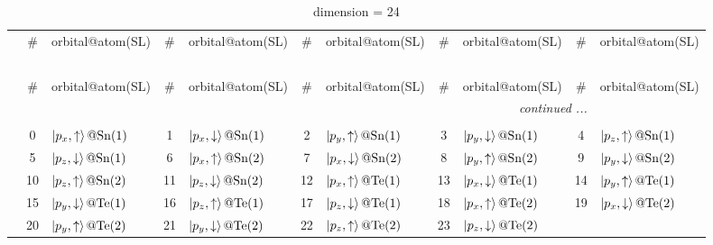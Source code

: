 \documentclass[fleqn,10pt,landscape]{jsarticle}
\begin{document}
\renewcommand{\arraystretch}{1.6}
\begin{longtable}[l]{c|cl|cl|cl|cl|cl}
\captionsetup{justification=raggedright, singlelinecheck=off}
\caption{dimension = 24}
 \\
 \hline \hline
 & \# & orbital@atom(SL) & \# & orbital@atom(SL) & \# & orbital@atom(SL) & \# & orbital@atom(SL) & \# & orbital@atom(SL) \\ \hline \endfirsthead

\multicolumn{10}{l}{\tablename\ \thetable{}} \\
 \hline \hline
 & \# & orbital@atom(SL) & \# & orbital@atom(SL) & \# & orbital@atom(SL) & \# & orbital@atom(SL) & \# & orbital@atom(SL) \\ \hline \endhead

 \hline \hline
\multicolumn{10}{r}{\footnotesize\it continued ...} \\ \endfoot

 \hline \hline
\multicolumn{10}{r}{} \\ \endlastfoot

 & 0 & $\ket{p_{x},\uparrow}@{\rm Sn}(1)$ & 1 & $\ket{p_{x},\downarrow}@{\rm Sn}(1)$ & 2 & $\ket{p_{y},\uparrow}@{\rm Sn}(1)$ & 3 & $\ket{p_{y},\downarrow}@{\rm Sn}(1)$ & 4 & $\ket{p_{z},\uparrow}@{\rm Sn}(1)$ \\
& 5 & $\ket{p_{z},\downarrow}@{\rm Sn}(1)$ & 6 & $\ket{p_{x},\uparrow}@{\rm Sn}(2)$ & 7 & $\ket{p_{x},\downarrow}@{\rm Sn}(2)$ & 8 & $\ket{p_{y},\uparrow}@{\rm Sn}(2)$ & 9 & $\ket{p_{y},\downarrow}@{\rm Sn}(2)$ \\
& 10 & $\ket{p_{z},\uparrow}@{\rm Sn}(2)$ & 11 & $\ket{p_{z},\downarrow}@{\rm Sn}(2)$ & 12 & $\ket{p_{x},\uparrow}@{\rm Te}(1)$ & 13 & $\ket{p_{x},\downarrow}@{\rm Te}(1)$ & 14 & $\ket{p_{y},\uparrow}@{\rm Te}(1)$ \\
& 15 & $\ket{p_{y},\downarrow}@{\rm Te}(1)$ & 16 & $\ket{p_{z},\uparrow}@{\rm Te}(1)$ & 17 & $\ket{p_{z},\downarrow}@{\rm Te}(1)$ & 18 & $\ket{p_{x},\uparrow}@{\rm Te}(2)$ & 19 & $\ket{p_{x},\downarrow}@{\rm Te}(2)$ \\
& 20 & $\ket{p_{y},\uparrow}@{\rm Te}(2)$ & 21 & $\ket{p_{y},\downarrow}@{\rm Te}(2)$ & 22 & $\ket{p_{z},\uparrow}@{\rm Te}(2)$ & 23 & $\ket{p_{z},\downarrow}@{\rm Te}(2)$ &  &  \\
\end{longtable}
\renewcommand{\arraystretch}{1.6}
\end{document}
